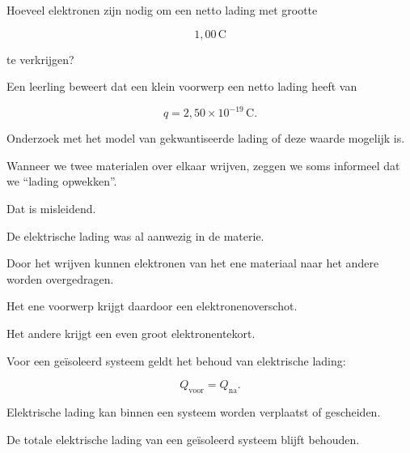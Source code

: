 \documentclass{ximera}
\begin{document}
\begin{oefening}{\oefB\ESS}

Hoeveel elektronen zijn nodig om een netto lading met grootte

\[
1{,}00\,\mathrm C
\]

te verkrijgen?

\end{oefening}


\begin{oefening}{\oefU\ESS}

Een leerling beweert dat een klein voorwerp een netto lading heeft van

\[
q=2{,}50\times10^{-19}\,\mathrm C.
\]

Onderzoek met het model van gekwantiseerde lading of deze waarde
mogelijk is.

\end{oefening}




Wanneer we twee materialen over elkaar wrijven, zeggen we soms
informeel dat we ``lading opwekken''.

Dat is misleidend.

De elektrische lading was al aanwezig in de materie.

Door het wrijven kunnen elektronen van het ene materiaal naar het
andere worden overgedragen.

Het ene voorwerp krijgt daardoor een elektronenoverschot.

Het andere krijgt een even groot elektronentekort.


Voor een geïsoleerd systeem geldt het behoud van elektrische lading:

\[
\boxed{
Q_\mathrm{voor}=Q_\mathrm{na}.
}
\]


\begin{opmerking}

Elektrische lading kan binnen een systeem worden verplaatst of
gescheiden.

De totale elektrische lading van een geïsoleerd systeem blijft
behouden.

\end{opmerking}
\end{document}
